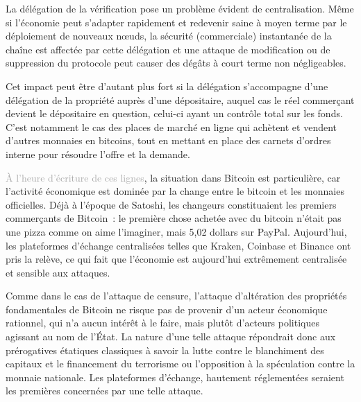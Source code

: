 La délégation de la vérification pose un problème évident de centralisation. Même si l'économie peut s'adapter rapidement et redevenir saine à moyen terme par le déploiement de nouveaux nœuds, la sécurité (commerciale) instantanée de la chaîne est affectée par cette délégation et une attaque de modification ou de suppression du protocole peut causer des dégâts à court terme non négligeables.

Cet impact peut être d'autant plus fort si la délégation s'accompagne d'une délégation de la propriété auprès d'une dépositaire, auquel cas le réel commerçant devient le dépositaire en question, celui-ci ayant un contrôle total sur les fonds. C'est notamment le cas des places de marché en ligne qui achètent et vendent d'autres monnaies en bitcoins, tout en mettant en place des carnets d'ordres interne pour résoudre l'offre et la demande.

\textcolor{darkgray}{À l'heure d'écriture de ces lignes}, la situation dans Bitcoin est particulière, car l'activité économique est dominée par la change entre le bitcoin et les monnaies officielles. Déjà à l'époque de Satoshi, les changeurs constituaient les premiers commerçants de Bitcoin~: le première chose achetée avec du bitcoin n'était pas une pizza comme on aime l'imaginer, mais 5,02 dollars sur PayPal. Aujourd'hui, les plateformes d'échange centralisées telles que Kraken, Coinbase et Binance ont pris la relève, ce qui fait que l'économie est aujourd'hui extrêmement centralisée et sensible aux attaques.

Comme dans le cas de l'attaque de censure, l'attaque d'altération des propriétés fondamentales de Bitcoin ne risque pas de provenir d'un acteur économique rationnel, qui n'a aucun intérêt à le faire, mais plutôt d'acteurs politiques agissant au nom de l'État. La nature d'une telle attaque répondrait donc aux prérogatives étatiques classiques à savoir la lutte contre le blanchiment des capitaux et le financement du terrorisme ou l'opposition à la spéculation contre la monnaie nationale. Les plateformes d'échange, hautement réglementées seraient les premières concernées par une telle attaque.

